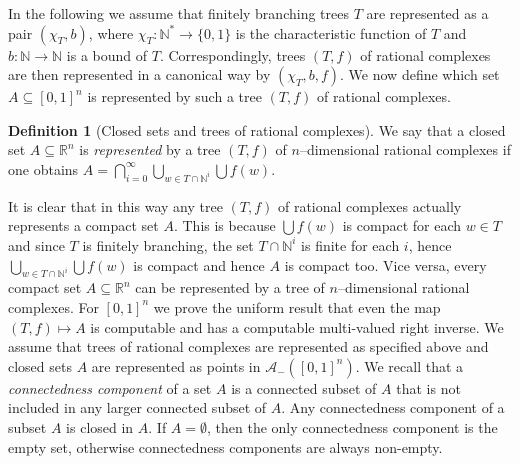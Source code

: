 \documentclass[a4paper]{amsart}
\def\AA{{\mathcal A}}
\def\IN{{\mathbb{N}}}
\def\IR{{\mathbb{R}}}
\def\In{\subseteq}
\theoremstyle{definition}
\newtheorem{definition}[theorem]{Definition}
\begin{document}
In the following we assume that finitely branching trees $T$ are represented as a pair $(\chi_T,b)$, where
$\chi_T:\IN^*\to\{0,1\}$ is the characteristic function of $T$ and $b:\IN\to\IN$ is a bound of $T$.
Correspondingly, trees $(T,f)$ of rational complexes are then represented in a canonical way by $(\chi_T,b,f)$.
We now define which set $A\In[0,1]^n$ is represented by such a tree $(T,f)$ of rational complexes. 

\begin{definition}[Closed sets and trees of rational complexes]
We say that a closed set $A\In\IR^n$ is {\em represented} by a tree $(T,f)$ of $n$--dimensional rational complexes
if one obtains $A=\bigcap_{i=0}^\infty\bigcup_{w\in T\cap\IN^i}\bigcup f(w)$.
\end{definition}

It is clear that in this way any tree $(T,f)$ of rational complexes actually represents a compact set $A$.
This is because $\bigcup f(w)$ is compact for each $w\in T$ and since $T$ is finitely branching, the set $T\cap\IN^i$
is finite for each $i$, hence $\bigcup_{w\in T\cap\IN^i}\bigcup f(w)$ is compact and hence $A$ is compact too.
Vice versa, every compact set $A\In\IR^n$ can be represented by a tree of $n$--dimensional rational complexes.
For $[0,1]^n$ we prove the uniform result that even the map $(T,f)\mapsto A$ is computable and has a computable multi-valued 
right inverse. We assume that trees of rational complexes are represented as specified above and closed sets $A$
are represented as points in $\AA_-([0,1]^n)$. 
We recall that a {\em connectedness component} of a set $A$ is a connected subset of $A$ that is not included in any larger connected
subset of $A$. Any connectedness component of a subset $A$ is closed in $A$. If $A=\emptyset$, then the only connectedness
component is the empty set, otherwise connectedness components are always non-empty.
\end{document}

